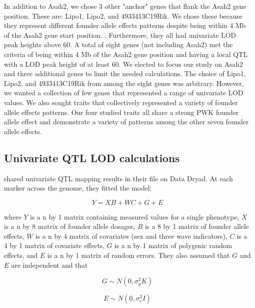 \documentclass{article}
\begin{document}
In addition to Asah2, we chose 3 other "anchor" genes that flank the Asah2 gene position. These are: Lipo1, Lipo2, and 4933413C19Rik. We chose these because they represent different founder allele effects patterns despite being within 4 Mb of the Asah2 gene start position.  . Furthermore, they all had univariate LOD peak heights above 60. A total of eight genes (not including Asah2) met the criteria of being within 4 Mb of the Asah2 gene position and having a local QTL with a LOD peak height of at least 60. We elected to focus our study on Asah2 and three additional genes to limit the needed calculations. The choice of Lipo1, Lipo2, and 4933413C19Rik from among the eight genes was arbitrary. However, we wanted a collection of few genes that represented a range of univariate LOD values. We also sought traits that collectively represented a variety of founder allele effects patterns. Our four studied traits all share a strong PWK founder allele effect and demonstrate a variety of patterns among the other seven founder allele effects. 

\subsection{Univariate QTL LOD calculations}

\citet{keller2018genetic} shared univariate QTL mapping results in their file on Data Dryad. At each marker across the genome, they fitted the model:

\begin{equation}
Y = XB + WC + G + E
\end{equation}

\noindent where $Y$ is a n by 1 matrix containing measured values for a single phenotype, $X$ is a n by 8 matrix of founder allele dosages, $B$ is a 8 by 1 matrix of founder allele effects, $W$ is a n by 4 matrix of covariates (sex and three wave indicators), $C$ is a 4 by 1 matrix of covariate effects, $G$ is a n by 1 matrix of polygenic random effects, and $E$ is a n by 1 matrix of random errors. They also assumed that $G$ and $E$ are independent and that 

\begin{equation}
G \sim N(0, \sigma_g^2K)
\end{equation}

\begin{equation}
E \sim N(0, \sigma_e^2I)
\end{equation}
\end{document}
